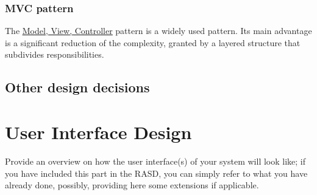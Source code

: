 \documentclass{article}
\newcommand{\link}[2]{{\color{blue}\underline{\href{#1}{#2}}}}
\begin{document}
		\subsubsection{MVC pattern}
			The \link{https://en.wikipedia.org/wiki/Model-view-controller}{Model, View, Controller} pattern is a widely 
			used pattern. Its main advantage is a significant reduction of the complexity, granted by a layered
			structure that subdivides responsibilities.
	\subsection{Other design decisions}
\section{User Interface Design}Provide	an	overview	on	how	the	user	interface(s)	of	your	system	will	
look	like; if	you	 have	included	 this	 part	in	 the	 RASD,	you	 can	 simply	 refer	 to	what	you	 have	
already	done,	possibly,	providing	here	some	extensions	if	applicable.
\end{document}
